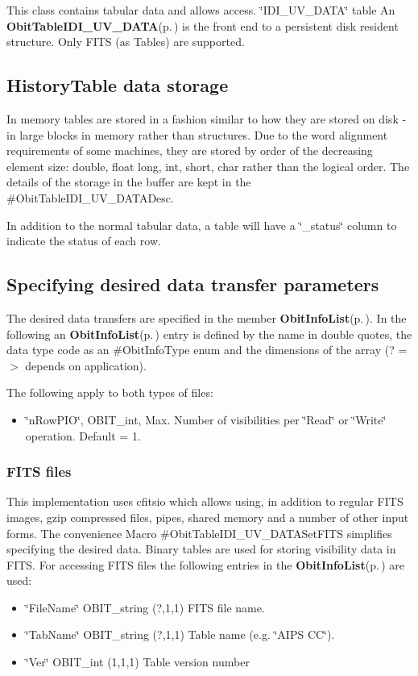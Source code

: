 This class contains tabular data and allows access. \char`\"{}IDI\_\-UV\_\-DATA\char`\"{} table An {\bf Obit\-Table\-IDI\_\-UV\_\-DATA}{\rm (p.\,\pageref{structObitTableIDI__UV__DATA})} is the front end to a persistent disk resident structure. Only FITS (as Tables) are supported.\subsection{History\-Table data storage}\label{ObitTableWX_8h_TableDataStorage}
In memory tables are stored in a fashion similar to how they are stored on disk - in large blocks in memory rather than structures. Due to the word alignment requirements of some machines, they are stored by order of the decreasing element size: double, float long, int, short, char rather than the logical order. The details of the storage in the buffer are kept in the \#Obit\-Table\-IDI\_\-UV\_\-DATADesc.

In addition to the normal tabular data, a table will have a \char`\"{}\_\-status\char`\"{} column to indicate the status of each row.\subsection{Specifying desired data transfer parameters}\label{ObitTableIDI__UV__DATA_8h_ObitTableIDI_UV_DATASpecification}
The desired data transfers are specified in the member {\bf Obit\-Info\-List}{\rm (p.\,\pageref{structObitInfoList})}. In the following an {\bf Obit\-Info\-List}{\rm (p.\,\pageref{structObitInfoList})} entry is defined by the name in double quotes, the data type code as an \#Obit\-Info\-Type enum and the dimensions of the array (? =$>$ depends on application).

The following apply to both types of files: \begin{itemize}
\item \char`\"{}n\-Row\-PIO\char`\"{}, OBIT\_\-int, Max. Number of visibilities per \char`\"{}Read\char`\"{} or \char`\"{}Write\char`\"{} operation. Default = 1.\end{itemize}
\subsubsection{FITS files}\label{ObitTableWX_8h_TableFITS}
This implementation uses cfitsio which allows using, in addition to regular FITS images, gzip compressed files, pipes, shared memory and a number of other input forms. The convenience Macro \#Obit\-Table\-IDI\_\-UV\_\-DATASet\-FITS simplifies specifying the desired data. Binary tables are used for storing visibility data in FITS. For accessing FITS files the following entries in the {\bf Obit\-Info\-List}{\rm (p.\,\pageref{structObitInfoList})} are used: \begin{itemize}
\item \char`\"{}File\-Name\char`\"{} OBIT\_\-string (?,1,1) FITS file name. \item \char`\"{}Tab\-Name\char`\"{} OBIT\_\-string (?,1,1) Table name (e.g. \char`\"{}AIPS CC\char`\"{}). \item \char`\"{}Ver\char`\"{} OBIT\_\-int (1,1,1) Table version number\end{itemize}
